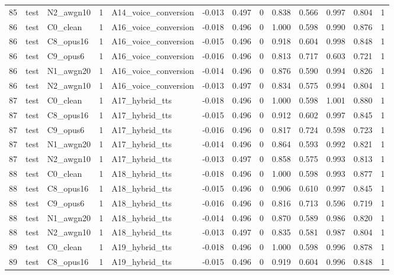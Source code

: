 \begin{tabular}{rllrlrrrrrrrr}
85 & test & N2_awgn10 & 1 & A14_voice_conversion & -0.013 & 0.497 & 0 & 0.838 & 0.566 & 0.997 & 0.804 & 1 \\
86 & test & C0_clean & 1 & A16_voice_conversion & -0.018 & 0.496 & 0 & 1.000 & 0.598 & 0.990 & 0.876 & 1 \\
86 & test & C8_opus16 & 1 & A16_voice_conversion & -0.015 & 0.496 & 0 & 0.918 & 0.604 & 0.998 & 0.848 & 1 \\
86 & test & C9_opus6 & 1 & A16_voice_conversion & -0.016 & 0.496 & 0 & 0.813 & 0.717 & 0.603 & 0.721 & 1 \\
86 & test & N1_awgn20 & 1 & A16_voice_conversion & -0.014 & 0.496 & 0 & 0.876 & 0.590 & 0.994 & 0.826 & 1 \\
86 & test & N2_awgn10 & 1 & A16_voice_conversion & -0.013 & 0.497 & 0 & 0.834 & 0.575 & 0.994 & 0.804 & 1 \\
87 & test & C0_clean & 1 & A17_hybrid_tts & -0.018 & 0.496 & 0 & 1.000 & 0.598 & 1.001 & 0.880 & 1 \\
87 & test & C8_opus16 & 1 & A17_hybrid_tts & -0.015 & 0.496 & 0 & 0.912 & 0.602 & 0.997 & 0.845 & 1 \\
87 & test & C9_opus6 & 1 & A17_hybrid_tts & -0.016 & 0.496 & 0 & 0.817 & 0.724 & 0.598 & 0.723 & 1 \\
87 & test & N1_awgn20 & 1 & A17_hybrid_tts & -0.014 & 0.496 & 0 & 0.864 & 0.593 & 0.992 & 0.821 & 1 \\
87 & test & N2_awgn10 & 1 & A17_hybrid_tts & -0.013 & 0.497 & 0 & 0.858 & 0.575 & 0.993 & 0.813 & 1 \\
88 & test & C0_clean & 1 & A18_hybrid_tts & -0.018 & 0.496 & 0 & 1.000 & 0.598 & 0.993 & 0.877 & 1 \\
88 & test & C8_opus16 & 1 & A18_hybrid_tts & -0.015 & 0.496 & 0 & 0.906 & 0.610 & 0.997 & 0.845 & 1 \\
88 & test & C9_opus6 & 1 & A18_hybrid_tts & -0.016 & 0.496 & 0 & 0.816 & 0.713 & 0.596 & 0.719 & 1 \\
88 & test & N1_awgn20 & 1 & A18_hybrid_tts & -0.014 & 0.496 & 0 & 0.870 & 0.589 & 0.986 & 0.820 & 1 \\
88 & test & N2_awgn10 & 1 & A18_hybrid_tts & -0.013 & 0.497 & 0 & 0.835 & 0.581 & 0.987 & 0.804 & 1 \\
89 & test & C0_clean & 1 & A19_hybrid_tts & -0.018 & 0.496 & 0 & 1.000 & 0.598 & 0.996 & 0.878 & 1 \\
89 & test & C8_opus16 & 1 & A19_hybrid_tts & -0.015 & 0.496 & 0 & 0.919 & 0.604 & 0.996 & 0.848 & 1 \\

\end{tabular}
